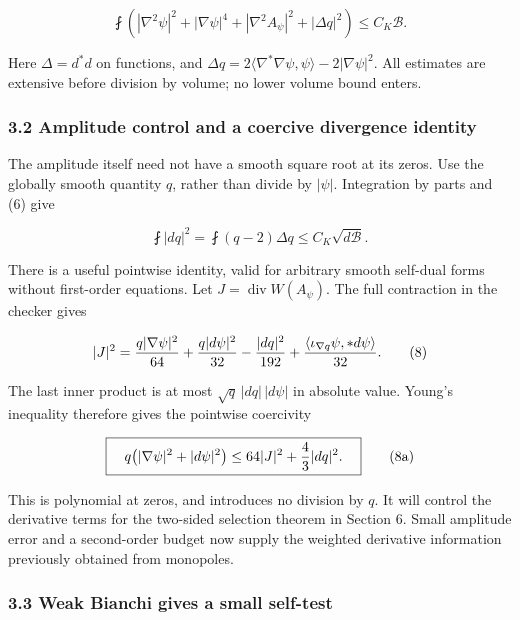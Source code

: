 \documentclass[
  10pt,
]{article}
\begin{document}
\[
 \fint\left(|\nabla^2\psi|^2+|\nabla\psi|^4+
              |\nabla^2A_\psi|^2+|\Delta q|^2\right)
 \le C_K\mathcal B.
                                                               \tag{6}
\]

Here \(\Delta=d^*d\) on functions, and
\(\Delta q=2\langle\nabla^*\nabla\psi,\psi\rangle -2|\nabla\psi|^2\).
All estimates are extensive before division by volume; no lower volume
bound enters.

\hypertarget{amplitude-control-and-a-coercive-divergence-identity}{%
\subsubsection{3.2 Amplitude control and a coercive divergence
identity}\label{amplitude-control-and-a-coercive-divergence-identity}}

The amplitude itself need not have a smooth square root at its zeros.
Use the globally smooth quantity \(q\), rather than divide by
\(|\psi|\). Integration by parts and (6) give

\[
 \fint|dq|^2=\fint(q-2)\Delta q
                  \le C_K\sqrt{d\mathcal B}.             \tag{7}
\]

There is a useful pointwise identity, valid for arbitrary smooth
self-dual forms without first-order equations. Let
\(J=\operatorname{div}W(A_\psi)\). The full contraction in the checker
gives

\[
 |J|^2={q|\nabla\psi|^2\over64}+{q|d\psi|^2\over32}
       -{|dq|^2\over192}
       +{\langle\iota_{\nabla q}\psi,*d\psi\rangle\over32}.
                                                               \tag{8}
\]

The last inner product is at most \(\sqrt q\,|dq|\,|d\psi|\) in absolute
value. Young's inequality therefore gives the pointwise coercivity

\[
 \boxed{\quad
 q\bigl(|\nabla\psi|^2+|d\psi|^2\bigr)
        \le64|J|^2+{4\over3}|dq|^2.
 \quad}                                                     \tag{8a}
\]

This is polynomial at zeros, and introduces no division by \(q\). It
will control the derivative terms for the two-sided selection theorem in
Section 6. Small amplitude error and a second-order budget now supply
the weighted derivative information previously obtained from monopoles.

\hypertarget{weak-bianchi-gives-a-small-self-test}{%
\subsubsection{3.3 Weak Bianchi gives a small
self-test}\label{weak-bianchi-gives-a-small-self-test}}
\end{document}
